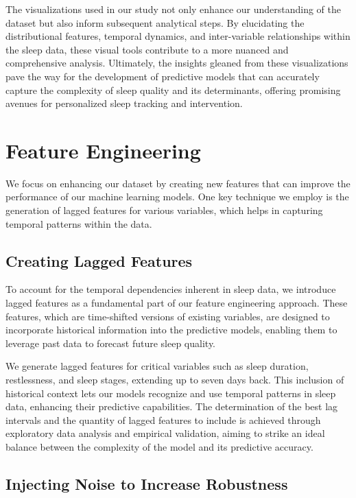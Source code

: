 \documentclass[10pt]{extarticle}
\begin{document}
The visualizations used in our study not only enhance our understanding of the dataset but also inform subsequent analytical steps. By elucidating the distributional features, temporal dynamics, and inter-variable relationships within the sleep data, these visual tools contribute to a more nuanced and comprehensive analysis. Ultimately, the insights gleaned from these visualizations pave the way for the development of predictive models that can accurately capture the complexity of sleep quality and its determinants, offering promising avenues for personalized sleep tracking and intervention.

\section{Feature Engineering}

We focus on enhancing our dataset by creating new features that can improve the performance of our machine learning models. One key technique we employ is the generation of lagged features for various variables, which helps in capturing temporal patterns within the data.

\subsection{Creating Lagged Features}

To account for the temporal dependencies inherent in sleep data, we introduce lagged features as a fundamental part of our feature engineering approach. These features, which are time-shifted versions of existing variables, are designed to incorporate historical information into the predictive models, enabling them to leverage past data to forecast future sleep quality.

We generate lagged features for critical variables such as sleep duration, restlessness, and sleep stages, extending up to seven days back. This inclusion of historical context lets our models recognize and use temporal patterns in sleep data, enhancing their predictive capabilities. The determination of the best lag intervals and the quantity of lagged features to include is achieved through exploratory data analysis and empirical validation, aiming to strike an ideal balance between the complexity of the model and its predictive accuracy.

\subsection{Injecting Noise to Increase Robustness}
\end{document}
